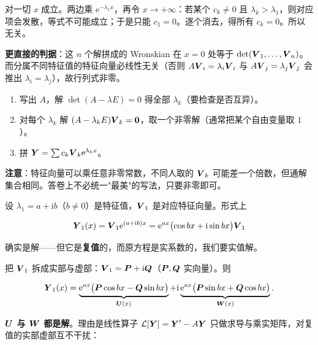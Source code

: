 \documentclass[11pt]{ctexart}
\begin{document}
对一切 $x$ 成立。两边乘 $\mathrm{e}^{-\lambda_1x}$，再令 $x\to+\infty$：若某个 $c_k\neq0$ 且 $\lambda_k>\lambda_1$，则对应项会发散，等式不可能成立；于是只能 $c_1=0$。逐个消去，得所有 $c_k=0$。所以无关。

\textbf{更直接的判据}：这 $n$ 个解拼成的 Wronskian 在 $x=0$ 处等于 $\det(\boldsymbol{V}_1,\dots,\boldsymbol{V}_n)$。而分属不同特征值的特征向量必线性无关（否则 $A\boldsymbol{V}_i=\lambda_i\boldsymbol{V}_i$ 与 $A\boldsymbol{V}_j=\lambda_j\boldsymbol{V}_j$ 会推出 $\lambda_i=\lambda_j$），故行列式非零。


\begin{enumerate}
  \item 写出 $A$，解 $\det(A-\lambda E)=0$ 得全部 $\lambda_k$（要检查是否互异）。
  \item 对每个 $\lambda_k$ 解 $(A-\lambda_kE)\boldsymbol{V}_k=\boldsymbol{0}$，取一个非零解（通常把某个自由变量取 $1$）。
  \item 拼 $\boldsymbol{Y}=\sum c_k\boldsymbol{V}_k\mathrm{e}^{\lambda_k x}$。
\end{enumerate}

\textbf{注意}：特征向量可以乘任意非零常数，不同人取的 $\boldsymbol{V}_k$ 可能差一个倍数，但通解集合相同。答卷上不必统一"最美"的写法，只要非零即可。



设 $\lambda_1=a+\mathrm{i}b$（$b\neq0$）是特征值，$\boldsymbol{V}_1$ 是对应特征向量。形式上

\[
\boldsymbol{Y}_1(x)=\boldsymbol{V}_1\mathrm{e}^{(a+\mathrm{i}b)x}
=\mathrm{e}^{ax}\bigl(\cos bx+\mathrm{i}\sin bx\bigr)\boldsymbol{V}_1
\]

确实是解——但它是\textbf{复值}的，而原方程是实系数的，我们要实值解。


把 $\boldsymbol{V}_1$ 拆成实部与虚部：$\boldsymbol{V}_1=\boldsymbol{P}+\mathrm{i}\boldsymbol{Q}$（$\boldsymbol{P},\boldsymbol{Q}$ 实向量）。则

\[
\boldsymbol{Y}_1(x)=\underbrace{\mathrm{e}^{ax}\bigl(\boldsymbol{P}\cos bx-\boldsymbol{Q}\sin bx\bigr)}_{\boldsymbol{U}(x)}
+\mathrm{i}\underbrace{\mathrm{e}^{ax}\bigl(\boldsymbol{P}\sin bx+\boldsymbol{Q}\cos bx\bigr)}_{\boldsymbol{W}(x)}.
\]

\textbf{$\boldsymbol{U}$ 与 $\boldsymbol{W}$ 都是解}。理由是线性算子 $\mathcal{L}[\boldsymbol{Y}]=\boldsymbol{Y}'-A\boldsymbol{Y}$ 只做求导与乘实矩阵，对复值的实部虚部互不干扰：
\end{document}
